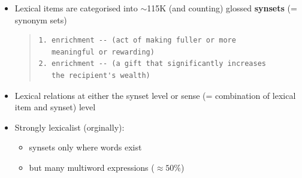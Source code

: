 \documentclass[headrule,footrule]{foils}
\begin{document}
\begin{itemize}
\item Lexical items are categorised into $\sim$115K (and counting) glossed \textbf{synsets} (= synonym sets)

  \begin{quote}\smaller[1]
\begin{verbatim}
1. enrichment -- (act of making fuller or more 
   meaningful or rewarding)
2. enrichment -- (a gift that significantly increases 
   the recipient's wealth)
\end{verbatim}
  \end{quote}
\item Lexical relations at either the synset level or sense (=
  combination of lexical item and synset) level 
\item Strongly lexicalist (orginally):
  \begin{itemize}
  \item synsets only where words exist
  \item but many multiword expressions ($\approx 50\%$)
  \end{itemize}


\end{itemize}






\MyLogo{}
\end{document}
